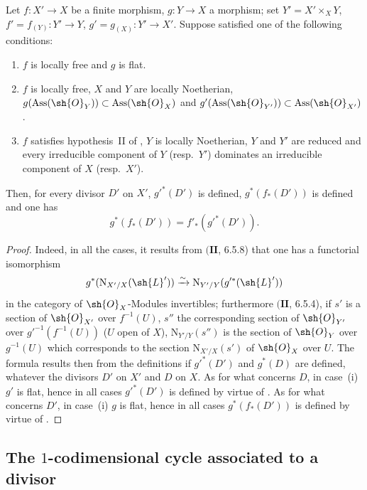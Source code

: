 \begin{proposition}[21.5.8]
\label{IV.21.5.8}
Let $f:X'\to X$ be a finite morphism, $g:Y\to X$ a morphism;
set $Y'=X'\times_X Y$, $f'=f_{(Y)}:Y'\to Y$, $g'=g_{(X)}:Y'\to X'$.
Suppose satisfied one of the following conditions:
\begin{enumerate}[label=\emph{(\roman*)}]
  \item $f$ is locally free and $g$ is flat.
  \item $f$ is locally free, $X$ and $Y$ are locally Noetherian, $g(\operatorname{Ass}(\sh{O}_Y))\subset\operatorname{Ass}(\sh{O}_X)$ and $g'(\operatorname{Ass}(\sh{O}_{Y'}))\subset\operatorname{Ass}(\sh{O}_{X'})$.
  \item $f$ satisfies hypothesis~\textup{II} of , $Y$ is locally Noetherian, $Y$ and $Y'$ are reduced and every irreducible component of $Y$ (resp.\ $Y'$) dominates an irreducible component of $X$ (resp.\ $X'$).
\end{enumerate}
Then, for every divisor $D'$ on $X'$, $g'^*(D')$ is defined, $g^*(f_*(D'))$ is defined and one has
\[
\label{IV.21.5.8.1}
  g^*(f_*(D'))=f'_*(g'^*(D')).
  \tag{21.5.8.1}
\]
\end{proposition}

\begin{proof}
Indeed, in all the cases, it results from $(\mathbf{II}$, 6.5.8) that one has a functorial isomorphism
\[
  g^*(\mathrm{N}_{X'/X}(\sh{L}'))\xrightarrow{\sim}\mathrm{N}_{Y'/Y}(g'^*(\sh{L}'))
\]
in the category of $\sh{O}_X$-Modules invertibles;
furthermore $(\mathbf{II}$, 6.5.4), if $s'$ is a section of $\sh{O}_{X'}$ over $f^{-1}(U)$, $s''$ the corresponding section of $\sh{O}_{Y'}$ over $g'^{-1}(f^{-1}(U))$ ($U$ open of $X$), $\mathrm{N}_{Y'/Y}(s'')$ is the section of $\sh{O}_Y$ over $g^{-1}(U)$ which corresponds to the section $\mathrm{N}_{X'/X}(s')$ of $\sh{O}_X$ over $U$.
The formula  results then from the definitions if $g'^*(D')$ and $g^*(D)$ are defined, whatever the divisors $D'$ on $X'$ and $D$ on $X$.
As for what concerns $D$, in case~(i) $g'$ is flat, hence in all cases $g'^*(D')$ is defined by virtue of .
As for what concerns $D'$, in case~(i) $g$ is flat, hence in all cases $g^*(f_*(D'))$ is defined by virtue of .
\end{proof}

\subsection{The $1$-codimensional cycle associated to a divisor}
\label{IV.21.6}

